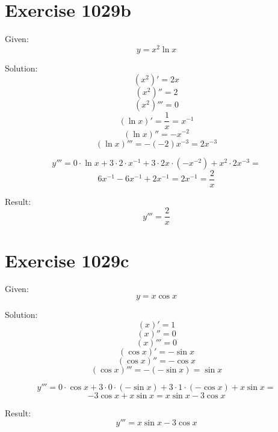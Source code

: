 \documentclass[a4paper, 10pt]{scrartcl}
\begin{document}
\section{Exercise 1029b}

Given:
\[
y = x^{2}\ln{x}
\]

Solution:
\[
(x^{2})' = 2x
\]
\[
(x^{2})'' = 2
\]
\[
(x^{2})''' = 0
\]
\[
(\ln{x})' = \frac{1}{x} = x^{-1}
\]
\[
(\ln{x})'' = -x^{-2}
\]
\[
(\ln{x})''' = -(-2)x^{-3} = 2x^{-3}
\]

\[
y''' = 0\cdot\ln{x} + 3\cdot 2\cdot x^{-1} + 3\cdot 2x\cdot (-x^{-2}) + x^{2}\cdot 2x^{-3} =
\]
\[
6x^{-1} - 6x^{-1} + 2x^{-1} = 2x^{-1} = \frac{2}{x}
\]

Result:
\[
y''' = \frac{2}{x}
\]

\section{Exercise 1029c}

Given:
\[
y = x\cos{x}
\]

Solution:
\[
(x)' = 1
\]
\[
(x)'' = 0
\]
\[
(x)''' = 0
\]
\[
(\cos{x})' = -\sin{x}
\]
\[
(\cos{x})'' = -\cos{x}
\]
\[
(\cos{x})''' = -(-\sin{x}) = \sin{x}
\]

\[
y''' = 0\cdot \cos{x} + 3\cdot 0\cdot (-\sin{x}) + 3\cdot 1\cdot (-\cos{x}) + x\sin{x} =
\]
\[
-3\cos{x} + x\sin{x} = x\sin{x} - 3\cos{x}
\]

Result:
\[
y''' = x\sin{x} - 3\cos{x}
\]
\end{document}
